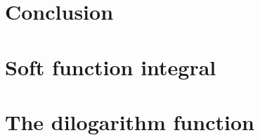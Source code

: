 \documentclass[12pt,twoside]{reedthesis}
\begin{document}
	
	

\chapter*{Conclusion}
\setcounter{chapter}{5}
\setcounter{section}{0}
	
	


\appendix
\chapter{Soft function integral}\label{app:soft function integral}

	\graphicspath{{appendix_soft_function/}}
	

\chapter{The dilogarithm function}\label{app:dilogarithm}

  



  \backmatter %



%  
 

\end{document}
